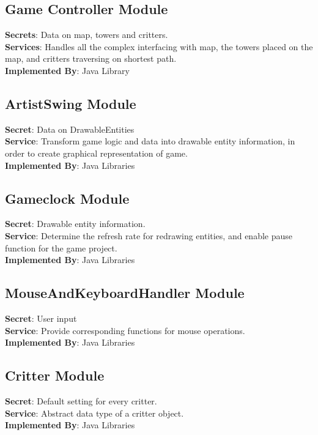 \documentclass[12,english]{article}
\begin{document}
	\subsection{Game Controller Module}
	\textbf{Secrets}: Data on map, towers and critters. \\
	\textbf{Services}: Handles all the complex interfacing with map, the towers placed on the map, and critters traversing on shortest path. \\
	\textbf{Implemented By}: Java Library \\
	
	\subsection{ArtistSwing Module}
	\textbf{Secret}: Data on DrawableEntities  \\
	\textbf{Service}: Transform game logic and data into drawable entity information, in order to create graphical representation of game.   \\  
	\textbf{Implemented By}: Java Libraries \\

	\subsection{Gameclock Module}
	\textbf{Secret}: Drawable entity information. \\
	\textbf{Service}: Determine the refresh rate for redrawing entities, and enable pause function for the game project. \\
	\textbf{Implemented By}: Java Libraries\\

	\subsection{MouseAndKeyboardHandler Module}
	\textbf{Secret}: User input \\
	\textbf{Service}: Provide corresponding functions for mouse operations. \\
	\textbf{Implemented By}: Java Libraries\\ 
	
	\subsection{Critter Module}
	\textbf{Secret}: Default setting for every critter. \\
	\textbf{Service}: Abstract data type of a critter object. \\
	\textbf{Implemented By}: Java Libraries\\
\end{document}
